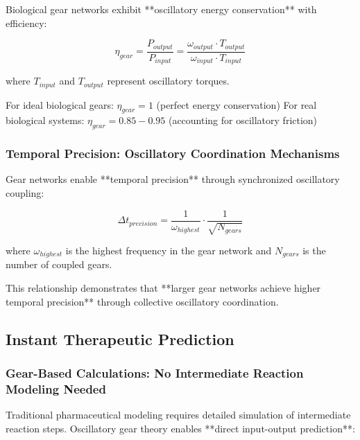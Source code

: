 \documentclass[12pt,a4paper]{article}
\begin{document}
Biological gear networks exhibit **oscillatory energy conservation** with efficiency:

\begin{equation}
\eta_{gear} = \frac{P_{output}}{P_{input}} = \frac{\omega_{output} \cdot T_{output}}{\omega_{input} \cdot T_{input}}
\end{equation}

where $T_{input}$ and $T_{output}$ represent oscillatory torques.

For ideal biological gears: $\eta_{gear} = 1$ (perfect energy conservation)
For real biological systems: $\eta_{gear} = 0.85 - 0.95$ (accounting for oscillatory friction)

\subsubsection{Temporal Precision: Oscillatory Coordination Mechanisms}

Gear networks enable **temporal precision** through synchronized oscillatory coupling:

\begin{equation}
\Delta t_{precision} = \frac{1}{\omega_{highest}} \cdot \frac{1}{\sqrt{N_{gears}}}
\end{equation}

where $\omega_{highest}$ is the highest frequency in the gear network and $N_{gears}$ is the number of coupled gears.

This relationship demonstrates that **larger gear networks achieve higher temporal precision** through collective oscillatory coordination.

\subsection{Instant Therapeutic Prediction}

\subsubsection{Gear-Based Calculations: No Intermediate Reaction Modeling Needed}

Traditional pharmaceutical modeling requires detailed simulation of intermediate reaction steps. Oscillatory gear theory enables **direct input-output prediction**:
\end{document}
